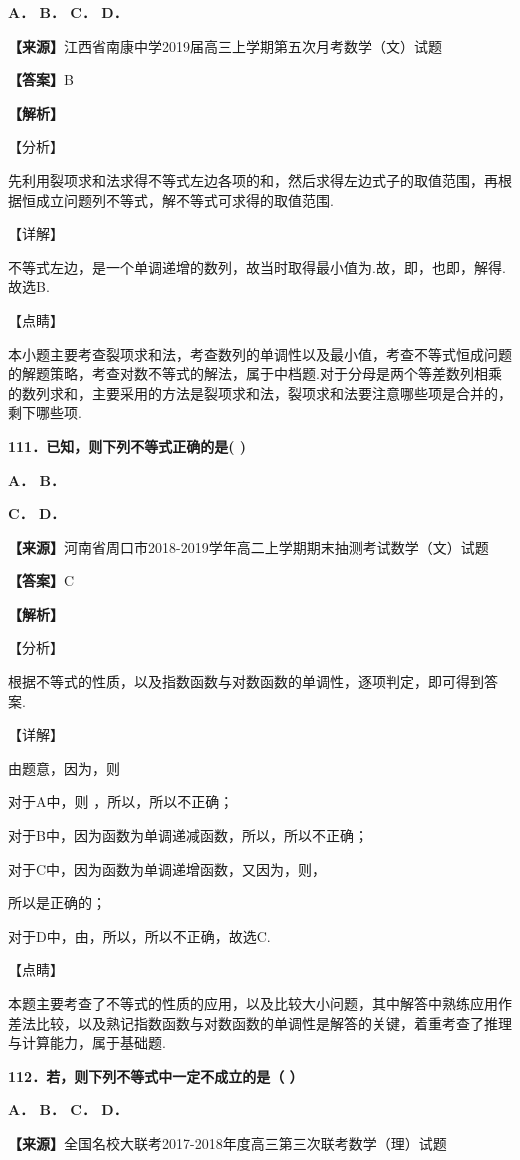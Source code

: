 \documentclass[
]{article}
\begin{document}
\textbf{A． B． C． D．}

\textbf{【来源】}江西省南康中学2019届高三上学期第五次月考数学（文）试题

\textbf{【答案】}B

\textbf{【解析】}

【分析】

先利用裂项求和法求得不等式左边各项的和，然后求得左边式子的取值范围，再根据恒成立问题列不等式，解不等式可求得的取值范围.

【详解】

不等式左边，是一个单调递增的数列，故当时取得最小值为.故，即，也即，解得.故选B.

【点睛】

本小题主要考查裂项求和法，考查数列的单调性以及最小值，考查不等式恒成问题的解题策略，考查对数不等式的解法，属于中档题.对于分母是两个等差数列相乘的数列求和，主要采用的方法是裂项求和法，裂项求和法要注意哪些项是合并的，剩下哪些项.

\textbf{111．已知，则下列不等式正确的是( )}

\textbf{A． B．}

\textbf{C． D．}

\textbf{【来源】}河南省周口市2018-2019学年高二上学期期末抽测考试数学（文）试题

\textbf{【答案】}C

\textbf{【解析】}

【分析】

根据不等式的性质，以及指数函数与对数函数的单调性，逐项判定，即可得到答案.

【详解】

由题意，因为，则

对于A中，则 ，所以，所以不正确；

对于B中，因为函数为单调递减函数，所以，所以不正确；

对于C中，因为函数为单调递增函数，又因为，则，

所以是正确的；

对于D中，由，所以，所以不正确，故选C.

【点睛】

本题主要考查了不等式的性质的应用，以及比较大小问题，其中解答中熟练应用作差法比较，以及熟记指数函数与对数函数的单调性是解答的关键，着重考查了推理与计算能力，属于基础题.

\textbf{112．若，则下列不等式中一定不成立的是（ ）}

\textbf{A． B． C． D．}

\textbf{【来源】}全国名校大联考2017-2018年度高三第三次联考数学（理）试题
\end{document}
